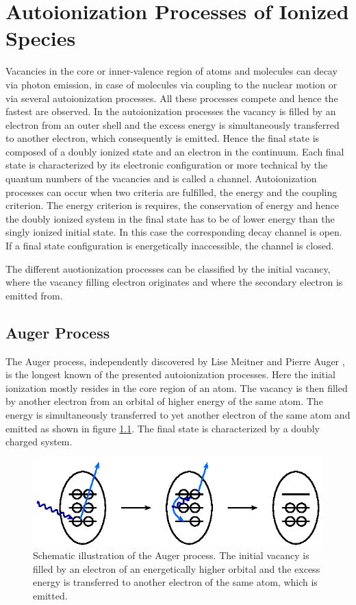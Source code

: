 \chapter{Autoionization Processes of Ionized Species}
\label{chapter:autoionization}
Vacancies in the core or inner-valence region of atoms and molecules
can decay via photon emission, in case of molecules via coupling to
the nuclear motion or via several autoionization processes. All these
processes compete and hence the fastest are observed. In the autoionization
processes
the vacancy is filled by an electron from an outer shell and the excess
energy is simultaneously transferred to another electron, which consequently
is emitted. Hence the final state is composed of a doubly ionized state
and an electron in the continuum. Each final state is characterized by its
electronic configuration or more technical by the quantum numbers of the
vacancies and is called a channel. Autoionization processes can
occur when two criteria are fulfilled, the energy and the coupling criterion.
The energy criterion is requires, the conservation of energy and hence
the doubly ionized system in the
final state has to be of lower energy than the singly ionized initial state.
In this case the corresponding decay channel is open. If a final state configuration
is energetically inaccessible, the channel is closed.

The different auotionization processes can be classified by the initial
vacancy, where the
vacancy filling electron originates and where the secondary electron is
emitted from.

\section{Auger Process}
The Auger process, independently discovered by Lise Meitner \cite{Meitner22}
and Pierre Auger \cite{Auger23}, is the longest known of the presented
autoionization processes. Here
the initial ionization mostly resides in the core region of an atom. The vacancy
is then filled by another electron from an orbital of higher energy of
the same atom. The
energy is simultaneously transferred to yet another electron of the same atom and
emitted as shown in figure \ref{figure:auger_process}. The final state is
characterized by a doubly charged system.

\begin{figure}[h]
 \centering
 \includegraphics{pics/auger-pspic.eps}
 \caption{Schematic illustration of the Auger process. The initial vacancy is
          filled by an electron of an energetically higher orbital and the
          excess energy is transferred to another electron of the same atom,
          which is emitted.}
 \label{figure:auger_process}
\end{figure}

